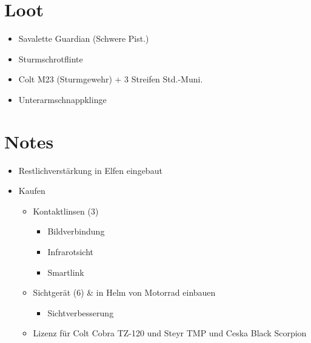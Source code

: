 {\begin{multicols}{2}
\section*{Loot}
\begin{itemize}
	\item Savalette Guardian (Schwere Pist.)
	\item Sturmschrotflinte
	\item Colt M23 (Sturmgewehr) + 3 Streifen Std.-Muni.
	\item Unterarmschnappklinge
\end{itemize}
\vphantom{2cm}

\section*{Notes}
\begin{itemize}
	\item Restlichverstärkung in Elfen eingebaut
	\item Kaufen
		\begin{itemize}
			\item Kontaktlinsen (3)
				\begin{itemize}	
					\item Bildverbindung
					\item Infrarotsicht
					\item Smartlink
				\end{itemize}
			\item Sichtgerät (6) \& in Helm von Motorrad einbauen
				\begin{itemize}
					\item Sichtverbesserung
				\end{itemize}
			\item Lizenz für Colt Cobra TZ-120 und Steyr TMP und Ceska Black Scorpion
		\end{itemize}
\end{itemize}
\end{multicols}

}
